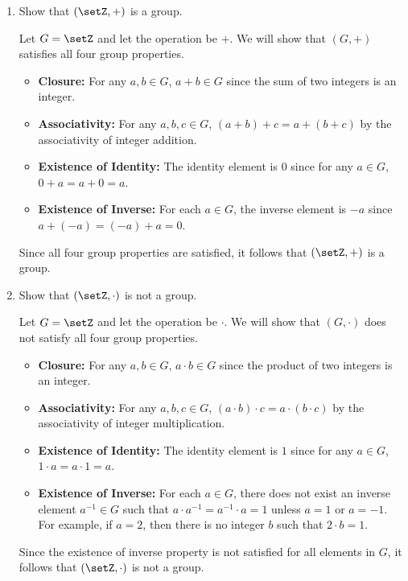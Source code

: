 \begin{enumerate}
  \item Show that \((\setZ, +)\) is a group.
  \begin{subprove}
    Let \(G = \setZ\) and let the operation be \(+\).
    We will show that \((G, +)\) satisfies all four group properties.
    \begin{itemize}
      \item \textbf{Closure:} For any \(a, b \in G\), \(a + b \in G\) since the sum of two integers is an integer.
      \item \textbf{Associativity:} For any \(a, b, c \in G\), \((a + b) + c = a + (b + c)\) by the associativity of integer addition.
      \item \textbf{Existence of Identity:} The identity element is \(0\) since for any \(a \in G\), \(0 + a = a + 0 = a\).
      \item \textbf{Existence of Inverse:} For each \(a \in G\), the inverse element is \(-a\) since \(a + (-a) = (-a) + a = 0\).
    \end{itemize}
    Since all four group properties are satisfied, it follows that \((\setZ, +)\) is a group.
  \end{subprove}
  \item Show that \((\setZ, \cdot)\) is not a group.
  \begin{subprove}
    Let \(G = \setZ\) and let the operation be \(\cdot\).
    We will show that \((G, \cdot)\) does not satisfy all four group properties.
    \begin{itemize}
      \item \textbf{Closure:} For any \(a, b \in G\), \(a \cdot b \in G\) since the product of two integers is an integer.
      \item \textbf{Associativity:} For any \(a, b, c \in G\), \((a \cdot b) \cdot c = a \cdot (b \cdot c)\) by the associativity of integer multiplication.
      \item \textbf{Existence of Identity:} The identity element is \(1\) since for any \(a \in G\), \(1 \cdot a = a \cdot 1 = a\).
      \item \textbf{Existence of Inverse:} For each \(a \in G\), there does not exist an inverse element \(a^{-1} \in G\) such that \(a \cdot a^{-1} = a^{-1} \cdot a = 1\) unless \(a = 1\) or \(a = -1\). For example, if \(a = 2\), then there is no integer \(b\) such that \(2 \cdot b = 1\).
    \end{itemize}
    Since the existence of inverse property is not satisfied for all elements in \(G\), it follows that \((\setZ, \cdot)\) is not a group.

\end{subprove}
\end{enumerate}
